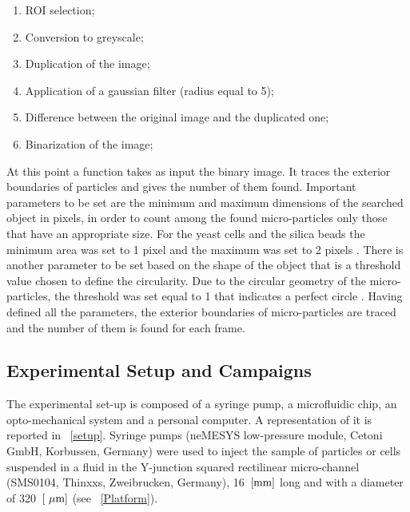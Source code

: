 \documentclass[journal]{IEEEtran}
\theoremstyle{definition}
\theoremstyle{remark}
\begin{document}
 \begin{enumerate}
 	\item ROI selection;
 	\item Conversion to greyscale;
 	\item Duplication of the image;
 	\item Application of a gaussian filter (radius equal to 5);
 	\item Difference between the original image and the duplicated one;
 	\item Binarization of the image;
 \end{enumerate}
At this point a function takes as input the binary image. It traces the exterior boundaries of particles and gives the number of them found.
Important parameters to be set are the minimum and maximum dimensions of the searched object in pixels, in order to count among the found micro-particles only those that have an appropriate size. For the yeast cells and the silica beads the minimum area was set to 1 pixel and the maximum was set to 2 pixels . There is another parameter to be set based on the shape of the object that is  a threshold value chosen to define the circularity. Due to the circular geometry of the micro-particles, the threshold was set equal to 1 that indicates a perfect circle .
Having defined all the parameters, the exterior boundaries of micro-particles are traced and the number of them is found for each frame.

\subsection{Experimental Setup and Campaigns}

The experimental set-up is composed of a syringe pump, a microfluidic chip, an opto-mechanical system and a personal computer. A representation of it is reported in ~\fig\ref{setup}. Syringe pumps (neMESYS low-pressure module, Cetoni GmbH,
Korbussen, Germany) were used to inject the sample of particles or cells suspended in a fluid in the Y-junction squared rectilinear micro-channel (SMS0104, Thinxxs, Zweibrucken, Germany), 16~$[\rm mm]$ long and with a diameter of 320~$[\rm~\mu m]$ (see ~\fig\ref{Platform}).
\end{document}
